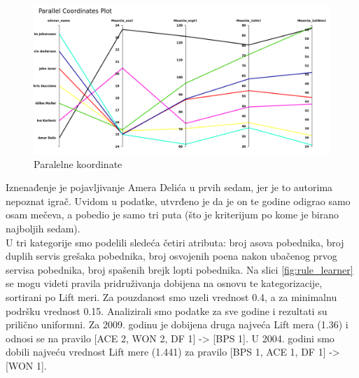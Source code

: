 \documentclass[a4paper]{article}
\begin{document}
\begin{figure}[H]
	\begin{center}
		\includegraphics[scale=0.30]{KNIME_project/PravilaPridruzivanja/parallel2009}
	\end{center}
	\caption{Paralelne koordinate}
	\label{fig:parallel}
\end{figure}

Iznenađenje je pojavljivanje Amera Delića u prvih sedam, jer je to
autorima nepoznat igrač. Uvidom u podatke, utvrđeno je da je on te godine odigrao samo osam mečeva,
a pobedio je samo tri puta (što je kriterijum po kome je birano najboljih sedam). \\

U tri kategorije smo podelili sledeća četiri atributa: broj asova pobednika, broj duplih servis grešaka pobednika,
broj osvojenih poena nakon ubačenog prvog servisa pobednika, broj spašenih brejk lopti pobednika.
Na slici \ref{fig:rule_learner} se mogu videti pravila pridruživanja dobijena na osnovu te kategorizacije,
sortirani po Lift meri. Za pouzdanost smo uzeli vrednost 0.4, a za minimalnu podršku vrednost 0.15.
Analizirali smo podatke za sve godine i rezultati su prilično uniformni. Za 2009. godinu je dobijena druga najveća
Lift mera (1.36) i odnosi se na pravilo [ACE 2, WON 2, DF 1] -> [BPS 1].
U 2004. godini smo dobili najveću vrednost Lift mere (1.441) za pravilo [BPS 1, ACE 1, DF 1] -> [WON 1].
\end{document}
